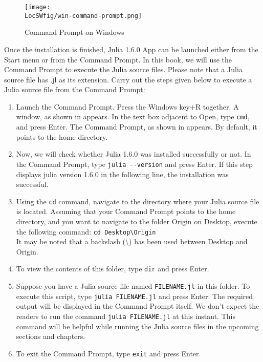 \begin{figure}
      \centering
      \texttt{[image: \\LocSWfig/win-command-prompt.png]}
      \caption{Command Prompt on Windows}
      \label{windows-cmd-julia}
\end{figure}
Once the installation is finished, Julia 1.6.0 App can be launched either
from the Start menu or from the Command Prompt. In this book, we will use the Command
Prompt to execute the Julia source files. Please note that a Julia source file has .jl as its extension.
Carry out the steps given below to execute a Julia source file from the Command Prompt:
\begin{enumerate}
      \item Launch the Command Prompt. Press the Windows key+R together. A window, as shown in 
            appears. In the text box adjacent to Open, type {\tt cmd}, and press Enter. The Command Prompt, as shown in
             appears. By default, it points to the home directory.
      \item Now, we will check whether Julia 1.6.0 was installed successfully or not.
            In the Command Prompt, type {\tt julia -{}-version} and press Enter.
            If this step displays julia version 1.6.0 in the following line, the installation was successful.
      \item Using the {\tt cd} command, navigate to the directory where your Julia source file is located.
            Assuming that your Command Prompt points to the
            home directory, and you want to navigate to the folder Origin on
            Desktop, execute the following command: {\tt cd Desktop\textbackslash Origin} \\
            It may be noted that a backslash (\textbackslash) has been used between
            Desktop and Origin.
      \item To view the contents of this folder, type {\tt dir} and press Enter.
      \item Suppose you have a Julia source file named {\tt FILENAME.jl} in this
            folder. To execute this script, type {\tt julia FILENAME.jl} and press
            Enter. The required output will be displayed in the Command Prompt itself.
            We don't expect the readers to run the command {\tt julia FILENAME.jl} at
            this instant. This command will be helpful while running the Julia
            source files in the upcoming sections and chapters.
      \item To exit the Command Prompt, type {\tt exit} and press Enter.
\end{enumerate}

